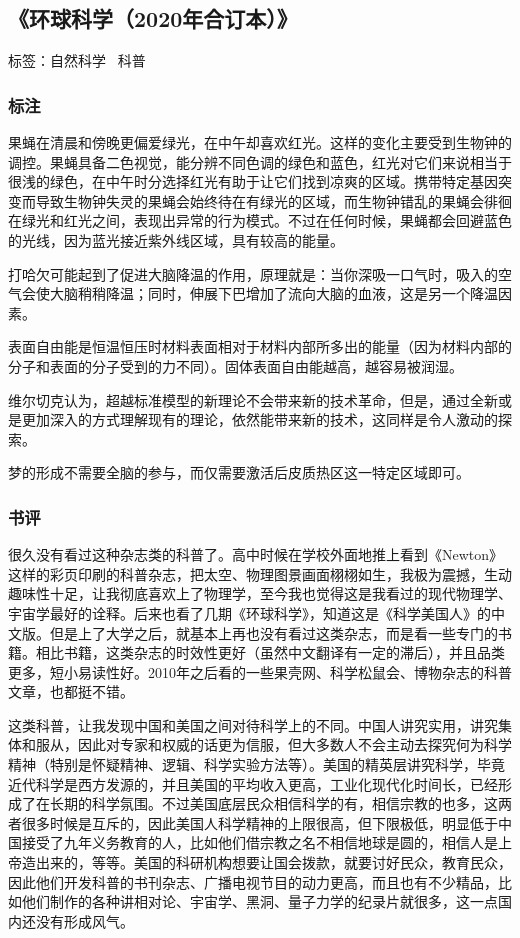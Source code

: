 \subsection{《环球科学（2020年合订本）》}

标签：自然科学 \ 科普

\subsubsection{标注}
果蝇在清晨和傍晚更偏爱绿光，在中午却喜欢红光。这样的变化主要受到生物钟的调控。果蝇具备二色视觉，能分辨不同色调的绿色和蓝色，红光对它们来说相当于很浅的绿色，在中午时分选择红光有助于让它们找到凉爽的区域。携带特定基因突变而导致生物钟失灵的果蝇会始终待在有绿光的区域，而生物钟错乱的果蝇会徘徊在绿光和红光之间，表现出异常的行为模式。不过在任何时候，果蝇都会回避蓝色的光线，因为蓝光接近紫外线区域，具有较高的能量。

打哈欠可能起到了促进大脑降温的作用，原理就是：当你深吸一口气时，吸入的空气会使大脑稍稍降温；同时，伸展下巴增加了流向大脑的血液，这是另一个降温因素。

表面自由能是恒温恒压时材料表面相对于材料内部所多出的能量（因为材料内部的分子和表面的分子受到的力不同）。固体表面自由能越高，越容易被润湿。

维尔切克认为，超越标准模型的新理论不会带来新的技术革命，但是，通过全新或是更加深入的方式理解现有的理论，依然能带来新的技术，这同样是令人激动的探索。

梦的形成不需要全脑的参与，而仅需要激活后皮质热区这一特定区域即可。

\subsubsection{书评}
很久没有看过这种杂志类的科普了。高中时候在学校外面地推上看到《Newton》这样的彩页印刷的科普杂志，把太空、物理图景画面栩栩如生，我极为震撼，生动趣味性十足，让我彻底喜欢上了物理学，至今我也觉得这是我看过的现代物理学、宇宙学最好的诠释。后来也看了几期《环球科学》，知道这是《科学美国人》的中文版。但是上了大学之后，就基本上再也没有看过这类杂志，而是看一些专门的书籍。相比书籍，这类杂志的时效性更好（虽然中文翻译有一定的滞后），并且品类更多，短小易读性好。2010年之后看的一些果壳网、科学松鼠会、博物杂志的科普文章，也都挺不错。

这类科普，让我发现中国和美国之间对待科学上的不同。中国人讲究实用，讲究集体和服从，因此对专家和权威的话更为信服，但大多数人不会主动去探究何为科学精神（特别是怀疑精神、逻辑、科学实验方法等）。美国的精英层讲究科学，毕竟近代科学是西方发源的，并且美国的平均收入更高，工业化现代化时间长，已经形成了在长期的科学氛围。不过美国底层民众相信科学的有，相信宗教的也多，这两者很多时候是互斥的，因此美国人科学精神的上限很高，但下限极低，明显低于中国接受了九年义务教育的人，比如他们借宗教之名不相信地球是圆的，相信人是上帝造出来的，等等。美国的科研机构想要让国会拨款，就要讨好民众，教育民众，因此他们开发科普的书刊杂志、广播电视节目的动力更高，而且也有不少精品，比如他们制作的各种讲相对论、宇宙学、黑洞、量子力学的纪录片就很多，这一点国内还没有形成风气。

